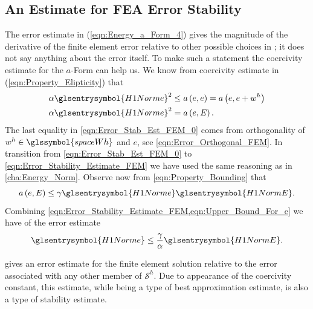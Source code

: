 \subsection{An Estimate for FEA Error Stability}
The error estimate in (\ref{eqn:Energy_a_Form_4}) gives the magnitude of the derivative of the finite element error relative to other
possible choices in ; it does not say anything about the error itself. To make such a statement the coercivity
estimate for the $a$-Form can help us. We know from coercivity estimate in (\ref{eqn:Property_Elipticity}) that
\begin{subequations}
	\begin{align}		
		\alpha \glsentrysymbol{H1Norme}^2 &\leq a \left(e,e\right) = a\left(e, e+w^h\right) \label{eqn:Error_Stab_Est_FEM_0} \\
		\alpha \glsentrysymbol{H1Norme}^2 &= a \left( e, E \right).	\label{eqn:Error_Stability_Estimate_FEM}
	\end{align}
\end{subequations}
The last equality in \cref{eqn:Error_Stab_Est_FEM_0} comes from orthogonality of $w^h \in \glssymbol{spaceWh}$ and $e$, see \cref{eqn:Error_Orthogonal_FEM}. In transition from \cref{eqn:Error_Stab_Est_FEM_0} to \cref{eqn:Error_Stability_Estimate_FEM} we have used the same reasoning as in \cref{cha:Energy_Norm}. Observe now from \cref{eqn:Property_Bounding} that
\begin{equation}	\label{eqn:Upper_Bound_For_e}
	a \left( e, E \right) \leq \gamma \glsentrysymbol{H1Norme} \glsentrysymbol{H1NormE}.
\end{equation}
Combining \cref{eqn:Error_Stability_Estimate_FEM,eqn:Upper_Bound_For_e} we have  of the error estimate
\begin{equation}	\label{eqn:H1_Error_Estimate_FEM}
	\glsentrysymbol{H1Norme} \leq \frac{\gamma}{\alpha} \glsentrysymbol{H1NormE}.
\end{equation}
\begin{remark}
	 gives an error estimate for the finite element solution relative to the error associated with any other member
	of $\mathcal{S}^h$. Due to appearance of the coercivity constant, this estimate, while being a type of best approximation estimate,
	is also a type of stability estimate.
\end{remark}
%
